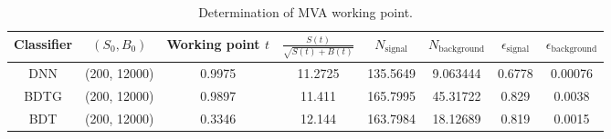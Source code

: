 \begin{table}[!t]
    \caption{Determination of MVA working point.}
    \label{tab:MVA_workingpoint}
    \centering
   \begin{tabular}{c|c|c|c|c|c|c|c} 
\hline Classifier & $(S_0, B_0)$ & Working point $t$ & $\frac{S(t)}{\sqrt{S(t)+B(t)}}$ & $N_{\textrm{signal}}$ & $N_{\textrm{background}}$ & $\epsilon_{\textrm{signal}}$ & $\epsilon_{\textrm{background}}$  \\ \hline 
DNN & (200, 12000) & 0.9975 & 11.2725 & 135.5649 & 9.063444 & 0.6778 & 0.00076 \\ BDTG & (200, 12000) & 0.9897 & 11.411 & 165.7995 & 45.31722 & 0.829 & 0.0038 \\ BDT & (200, 12000) & 0.3346 & 12.144 & 163.7984 & 18.12689 & 0.819 & 0.0015 \\ \hline 
\end{tabular}

\end{table}